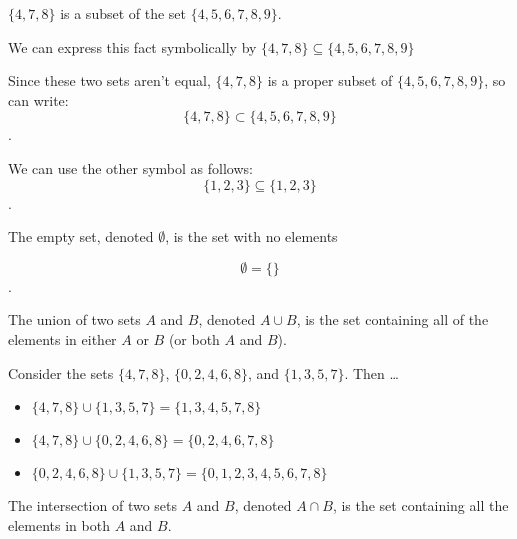 \begin{example}
  \label{exm:subset}

  $\{ 4, 7, 8 \}$ is a subset of the set $\{ 4, 5, 6, 7, 8, 9 \}$.

  We can express this fact symbolically by
  $\{ 4, 7, 8 \} \subseteq \{ 4, 5, 6, 7, 8, 9 \}$ 

  Since these two sets aren't equal, $\{ 4, 7, 8 \}$ is a proper subset of
  $\{ 4, 5, 6, 7, 8, 9 \}$, so can write:
  \[ \{ 4, 7, 8 \} \subset \{ 4, 5, 6, 7, 8, 9 \} \].

  We can use the other symbol as follows:
  \[ \{ 1, 2, 3 \} \subseteq \{ 1, 2, 3 \} \].
\end{example}

\begin{definition}
  \label{def:empty_set}

  The empty set, denoted $\emptyset$, is the set with no elements

  \[ \emptyset = \{ \} \].
\end{definition}

\begin{definition}[Union]
  \label{def:union}

  The union of two sets $A$ and $B$, denoted $A \cup B$, is the set containing
  all of the elements in either $A$ or $B$ (or both $A$ and $B$).
\end{definition}

\begin{example}
  \label{exm:union}

  Consider the sets $\{ 4, 7, 8 \}$, $\{ 0, 2, 4, 6, 8 \}$, and
  $\{ 1, 3, 5, 7 \}$. Then \ldots

  \begin{itemize}
    \label{item:union}
  
    \item $\{ 4, 7, 8 \} \cup  \{ 1, 3, 5, 7 \} = \{ 1, 3, 4, 5, 7, 8 \}$
    \item $\{ 4, 7, 8 \} \cup  \{ 0, 2, 4, 6, 8 \} = \{ 0, 2, 4, 6, 7, 8 \}$
    \item $\{ 0, 2, 4, 6, 8 \} \cup  \{ 1, 3, 5, 7 \} = \{ 0, 1, 2, 3, 4, 5, 6,
      7, 8 \}$
  \end{itemize}
\end{example}

\begin{definition}[Intersection]
  \label{def:intersection}

  The intersection of two sets $A$ and $B$, denoted $A \cap B$, is the set
  containing all the elements in both $A$ and $B$.
\end{definition}

